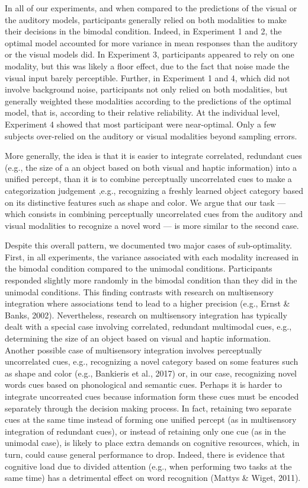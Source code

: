 \documentclass[english,,man,floatsintext]{apa6}
\theoremstyle{definition}
\theoremstyle{definition}
\theoremstyle{definition}
\theoremstyle{remark}
\begin{document}
In all of our experiments, and when compared to the predictions of the
visual or the auditory models, participants generally relied on both
modalities to make their decisions in the bimodal condition. Indeed, in
Experiment 1 and 2, the optimal model accounted for more variance in
mean responses than the auditory or the visual models did. In Experiment
3, participants appeared to rely on one modality, but this was likely a
floor effect, due to the fact that noise made the visual input barely
perceptible. Further, in Experiment 1 and 4, which did not involve
background noise, participants not only relied on both modalities, but
generally weighted these modalities according to the predictions of the
optimal model, that is, according to their relative reliability. At the
individual level, Experiment 4 showed that most participant were
near-optimal. Only a few subjects over-relied on the auditory or visual
modalities beyond sampling errors.

More generally, the idea is that it is easier to integrate correlated,
redundant cues (e.g., the size of a an object based on both visual and
haptic information) into a unified percept, than it is to combine
perceptually uncorrelated cues to make a categorization judgement ,e.g.,
recognizing a freshly learned object category based on its distinctive
features such as shape and color. We argue that our task --- which
consists in combining perceptually uncorrelated cues from the auditory
and visual modalities to recognize a novel word --- is more similar to
the second case.

Despite this overall pattern, we documented two major cases of
sub-optimality. First, in all experiments, the variance associated with
each modality increased in the bimodal condition compared to the
unimodal conditions. Participants responded slightly more randomly in
the bimodal condition than they did in the unimodal conditions. This
finding contrasts with research on multisensory integration where
associations tend to lead to a higher precision (e.g., Ernst \& Banks,
2002). Nevertheless, research on multisensory integration has typically
dealt with a special case involving correlated, redundant multimodal
cues, e.g., determining the size of an object based on visual and haptic
information. Another possible case of multisensory integration involves
perceptually uncorrelated cues, e.g., recognizing a novel category based
on some features such as shape and color (e.g., Bankieris et al., 2017)
or, in our case, recognizing novel words cues based on phonological and
semantic cues. Perhaps it is harder to integrate uncorreated cues
because information form these cues must be encoded separately through
the decision making process. In fact, retaining two separate cues at the
same time instead of forming one unified percept (as in multisensory
integration of redundant cues), or instead of retaining only one cue (as
in the unimodal case), is likely to place extra demands on cognitive
resources, which, in turn, could cause general performance to drop.
Indeed, there is evidence that cognitive load due to divided attention
(e.g., when performing two tasks at the same time) has a detrimental
effect on word recognition (Mattys \& Wiget, 2011).
\end{document}
